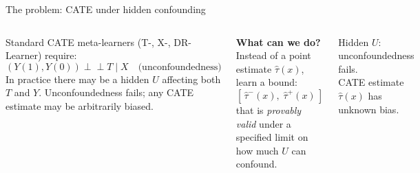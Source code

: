 \documentclass[aspectratio=169]{beamer}
\newcommand{\indep}{\perp\!\!\!\perp}
\begin{document}
\begin{frame}{The problem: CATE under hidden confounding}

\begin{columns}
Standard CATE meta-learners (T-, X-, DR-Learner) require:
\[
  (Y(1),Y(0)) \indep T \mid X \quad\text{(unconfoundedness)}
\]
In practice there may be a hidden $U$ affecting both $T$ and $Y$. Unconfoundedness fails; any CATE estimate may be arbitrarily biased.

\medskip
\textbf{What can we do?}\\
Instead of a point estimate $\hat\tau(x)$, learn a bound:
\[
  [\,\hat\tau^-(x),\; \hat\tau^+(x)\,]
\]
that is \emph{provably valid} under a specified limit on how much $U$ can confound.


\vspace{0.4em}
\small Hidden $U$: unconfoundedness fails.\\
CATE estimate $\hat\tau(x)$ has unknown bias.
\end{columns}
\end{frame}

\end{document}
